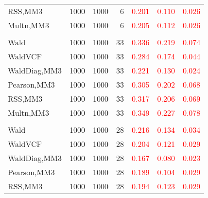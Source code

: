 \documentclass[
]{article}
\begin{document}
\begin{table}[H]
{\begin{tabular}[t]{lrrrrrr}
\hspace{1em}RSS,MM3 & 1000 & 1000 & 6 & \textcolor{red}{0.201} & \textcolor{red}{0.110} & \textcolor{red}{0.026}\\
\hspace{1em}Multn,MM3 & 1000 & 1000 & 6 & \textcolor{red}{0.205} & \textcolor{red}{0.112} & \textcolor{red}{0.026}\\
\addlinespace[0.3em]
\multicolumn{7}{l}{\textbf{1F 15V}}\\
\hspace{1em}Wald & 1000 & 1000 & 33 & \textcolor{red}{0.336} & \textcolor{red}{0.219} & \textcolor{red}{0.074}\\
\hspace{1em}WaldVCF & 1000 & 1000 & 33 & \textcolor{red}{0.284} & \textcolor{red}{0.174} & \textcolor{red}{0.044}\\
\hspace{1em}WaldDiag,MM3 & 1000 & 1000 & 33 & \textcolor{red}{0.221} & \textcolor{red}{0.130} & \textcolor{red}{0.024}\\
\hspace{1em}Pearson,MM3 & 1000 & 1000 & 33 & \textcolor{red}{0.305} & \textcolor{red}{0.202} & \textcolor{red}{0.068}\\
\hspace{1em}RSS,MM3 & 1000 & 1000 & 33 & \textcolor{red}{0.317} & \textcolor{red}{0.206} & \textcolor{red}{0.069}\\
\hspace{1em}Multn,MM3 & 1000 & 1000 & 33 & \textcolor{red}{0.349} & \textcolor{red}{0.227} & \textcolor{red}{0.078}\\
\addlinespace[0.3em]
\multicolumn{7}{l}{\textbf{2F 10V}}\\
\hspace{1em}Wald & 1000 & 1000 & 28 & \textcolor{red}{0.216} & \textcolor{red}{0.134} & \textcolor{red}{0.034}\\
\hspace{1em}WaldVCF & 1000 & 1000 & 28 & \textcolor{red}{0.204} & \textcolor{red}{0.121} & \textcolor{red}{0.029}\\
\hspace{1em}WaldDiag,MM3 & 1000 & 1000 & 28 & \textcolor{red}{0.167} & \textcolor{red}{0.080} & \textcolor{red}{0.023}\\
\hspace{1em}Pearson,MM3 & 1000 & 1000 & 28 & \textcolor{red}{0.189} & \textcolor{red}{0.104} & \textcolor{red}{0.029}\\
\hspace{1em}RSS,MM3 & 1000 & 1000 & 28 & \textcolor{red}{0.194} & \textcolor{red}{0.123} & \textcolor{red}{0.029}\\

\end{tabular}}
\end{table}
\end{document}
